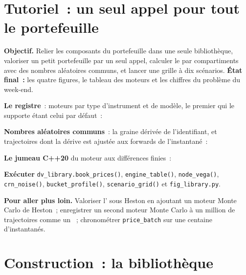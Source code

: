 \section{Tutoriel~: un seul appel pour tout le portefeuille}\label{tut:dv:build-a-pricing-library:tut}

\begin{tutorial}
\textbf{Objectif.} Relier les composants du portefeuille dans une seule bibliothèque, valoriser un petit portefeuille par un seul appel, calculer le  par compartiments avec des nombres aléatoires communs, et lancer une
grille à dix scénarios. \textbf{État final~:} les quatre figures, le tableau des moteurs et les chiffres du problème du week-end.
\begin{tutsteps}
\item \textbf{Le registre}~: moteurs par type d'instrument et de modèle, le premier qui le supporte étant celui par défaut~:
\label{lst:dv:build-a-pricing-library:registry}
\item \textbf{Nombres aléatoires communs}~: la graine dérivée de l'identifiant, et trajectoires dont la dérive est ajustée aux forwards de l'instantané~:
\label{lst:dv:build-a-pricing-library:mc}
\item \textbf{Le jumeau C++20} du moteur aux différences finies~:
\label{lst:dv:build-a-pricing-library:cpp}
\item \textbf{Exécuter} \texttt{dv\_library.book\_prices()}, \texttt{engine\_table()}, \texttt{node\_vega()}, \texttt{crn\_noise()}, \texttt{bucket\_profile()},
\texttt{scenario\_grid()} et \texttt{fig\_library.py}.
\end{tutsteps}
\textbf{Pour aller plus loin.} Valoriser l' sous Heston en ajoutant un moteur Monte Carlo de Heston~; enregistrer un second moteur Monte Carlo à un million de trajectoires comme
un ~; chronométrer \texttt{price\_batch} sur une centaine d'instantanés.
\end{tutorial}

\section{Construction~: la bibliothèque}\label{bld:dv:build-a-pricing-library:pricing}

